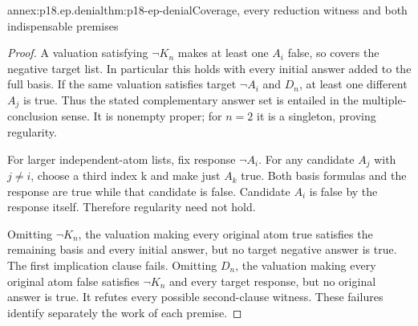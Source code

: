 \begin{annexitem}{annex:p18.ep.denial}{thm:p18-ep-denial}{Coverage, every reduction witness and both indispensable premises}
\begin{proof}
A valuation satisfying \(\neg K_n\) makes at least one \(A_i\)
false, so covers the negative target list. In particular this holds
with every initial answer added to the full basis. If the same
valuation satisfies target \(\neg A_i\) and \(D_n\), at least one
different \(A_j\) is true. Thus the stated complementary answer set
is entailed in the multiple-conclusion sense. It is nonempty proper;
for \(n=2\) it is a singleton, proving regularity.

For larger independent-atom lists, fix response \(\neg A_i\).
For any candidate \(A_j\) with \(j\ne i\), choose a third index
k and make just \(A_k\) true. Both basis formulas and the response
are true while that candidate is false. Candidate \(A_i\) is false
by the response itself. Therefore regularity need not hold.

Omitting \(\neg K_n\), the valuation making every original atom
true satisfies the remaining basis and every initial answer, but
no target negative answer is true. The first implication clause fails.
Omitting \(D_n\), the valuation making every original atom false
satisfies \(\neg K_n\) and every target response, but no original
answer is true. It refutes every possible second-clause witness.
These failures identify separately the work of each premise.
\end{proof}
\end{annexitem}

